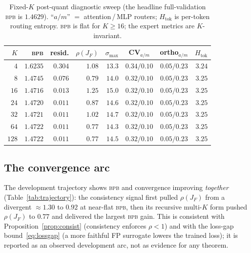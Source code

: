 \documentclass[11pt]{article}
\newcommand{\rhoF}{\rho(J_F)}
\newcommand{\bpb}{\textsc{bpb}}
\begin{document}
\begin{table}[H]
\centering
\footnotesize
\setlength{\tabcolsep}{5pt}
\renewcommand{\arraystretch}{1.2}
\begin{tabular}{@{}r r r r r c c r@{}}
\toprule
$K$ & \bpb{} & resid. & $\rhoF$ & $\sigma_{\max}$ & CV$_{a/m}$ & ortho$_{a/m}$ & $H_{\text{tok}}$ \\
\midrule
$4$   & $1.6235$ & $0.304$ & $1.08$ & $13.3$ & $0.34/0.10$ & $0.05/0.23$ & $3.24$ \\
$8$   & $1.4745$ & $0.076$ & $0.79$ & $14.0$ & $0.32/0.10$ & $0.05/0.23$ & $3.25$ \\
$16$  & $1.4716$ & $0.013$ & $1.25$ & $15.0$ & $0.32/0.10$ & $0.05/0.23$ & $3.25$ \\
$24$  & $1.4720$ & $0.011$ & $0.87$ & $14.6$ & $0.32/0.10$ & $0.05/0.23$ & $3.25$ \\
$32$  & $1.4721$ & $0.011$ & $1.02$ & $14.7$ & $0.32/0.10$ & $0.05/0.23$ & $3.25$ \\
$64$  & $1.4722$ & $0.011$ & $0.77$ & $14.3$ & $0.32/0.10$ & $0.05/0.23$ & $3.25$ \\
$128$ & $1.4722$ & $0.011$ & $0.77$ & $14.5$ & $0.32/0.10$ & $0.05/0.23$ & $3.25$ \\
\bottomrule
\end{tabular}
\caption{Fixed-$K$ post-quant diagnostic sweep (the headline full-validation \bpb{} is $1.4629$).
``$a/m$'' $=$ attention\,/\,MLP routers; $H_{\text{tok}}$ is per-token routing entropy.  \bpb{} is
flat for $K\ge16$; the expert metrics are $K$-invariant.}
\label{tab:ksweep}
\end{table}

\subsection{The convergence arc}
\label{sec:arc}

The development trajectory shows \bpb{} and convergence improving \emph{together}
(Table~\ref{tab:trajectory}): the consistency signal first pulled $\rhoF$ from a divergent
$\approx1.30$ to $0.92$ at near-flat \bpb, then its recursive multi-$K$ form pushed $\rhoF$ to
$0.77$ and delivered the largest \bpb{} gain.  This is consistent with Proposition~\ref{prop:consist}
(consistency enforces $\rho<1$) and with the loss-gap bound~\eqref{eq:lossgap} (a more faithful FP
surrogate lowers the trained loss); it is reported as an observed development arc, not as evidence
for any theorem.
\end{document}
